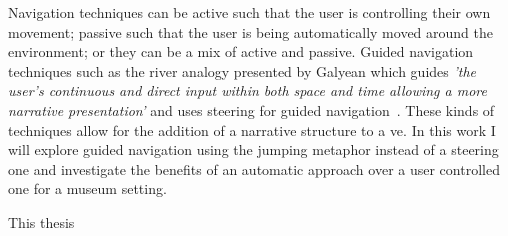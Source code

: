Navigation techniques can be active such that the user is controlling their own movement; passive such that the user is being automatically moved around the environment; or they can be a mix of active and passive. Guided navigation techniques such as the river analogy presented by Galyean which guides \textit{'the user’s continuous and direct input within both space and time allowing a more narrative presentation'} and uses steering for guided navigation~\cite{Galyean1995}. These kinds of techniques allow for the addition of a narrative structure to a \acrshort{ve}. In this work I will explore guided navigation using the jumping metaphor instead of a steering one and investigate the benefits of an automatic approach over a user controlled one for a museum setting. 

This thesis 

